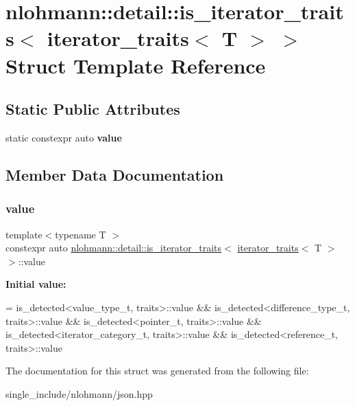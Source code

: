 \hypertarget{structnlohmann_1_1detail_1_1is__iterator__traits_3_01iterator__traits_3_01T_01_4_01_4}{}\section{nlohmann\+:\+:detail\+:\+:is\+\_\+iterator\+\_\+traits$<$ iterator\+\_\+traits$<$ T $>$ $>$ Struct Template Reference}
\label{structnlohmann_1_1detail_1_1is__iterator__traits_3_01iterator__traits_3_01T_01_4_01_4}
\subsection*{Static Public Attributes}
\begin{DoxyCompactItemize}
\item 
static constexpr auto {\bfseries value}
\end{DoxyCompactItemize}


\subsection{Member Data Documentation}
\mbox{\label{structnlohmann_1_1detail_1_1is__iterator__traits_3_01iterator__traits_3_01T_01_4_01_4_ac2711760b352b8921accc6609957dc90}} 
\subsubsection{\texorpdfstring{value}{value}}
{\footnotesize\ttfamily template$<$typename T $>$ \\
constexpr auto \hyperlink{structnlohmann_1_1detail_1_1is__iterator__traits}{nlohmann\+::detail\+::is\+\_\+iterator\+\_\+traits}$<$ \hyperlink{structnlohmann_1_1detail_1_1iterator__traits}{iterator\+\_\+traits}$<$ T $>$ $>$\+::value\hspace{0.3cm}{\ttfamily [static]}}

{\bfseries Initial value\+:}
\begin{DoxyCode}
=
        is\_detected<value\_type\_t, traits>::value &&
        is\_detected<difference\_type\_t, traits>::value &&
        is\_detected<pointer\_t, traits>::value &&
        is\_detected<iterator\_category\_t, traits>::value &&
        is\_detected<reference\_t, traits>::value
\end{DoxyCode}


The documentation for this struct was generated from the following file\+:\begin{DoxyCompactItemize}
\item 
single\+\_\+include/nlohmann/json.\+hpp\end{DoxyCompactItemize}
